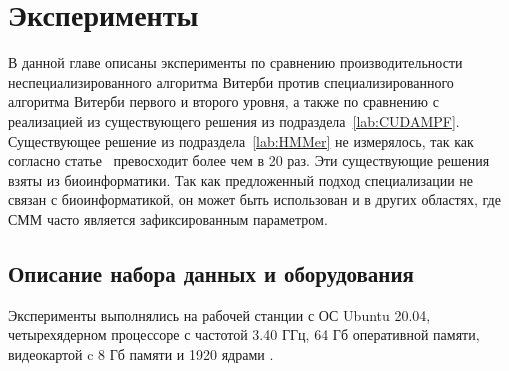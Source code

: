 \section{Эксперименты}
В данной главе описаны эксперименты по сравнению 
производительности неспециализированного алгоритма Витерби 
против специализированного алгоритма Витерби первого и 
второго уровня,
а также по сравнению с реализацией из существующего решения 
 из 
подраздела~\ref{lab:CUDAMPF}.
Существующее решение  из 
подраздела~\ref{lab:HMMer} не измерялось, так как согласно 
статье~\cite{cudampf}  превосходит  
более чем в 20 раз.
Эти существующие решения взяты из биоинформатики.
Так как предложенный подход специализации не связан с 
биоинформатикой, он может быть использован и в других 
областях, где СММ часто является зафиксированным параметром.

\subsection{Описание набора данных и оборудования}
\label{sec:data}
Эксперименты выполнялись на рабочей станции с ОС Ubuntu 
20.04, четырехядерном процессоре  с частотой 3.40 ГГц, 64 Гб оперативной памяти, видеокартой 
 c 8 Гб памяти и 1920 ядрами .

